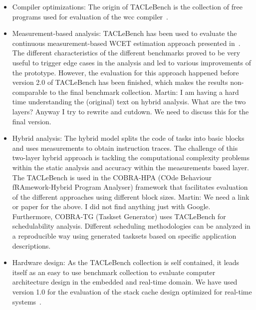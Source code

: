 \documentclass[a4paper,UKenglish]{oasics}
\newcommand{\todo}[1]{{\emph{TODO: #1}}}
\newcommand{\martin}[1]{{\color{blue} Martin: #1}}
\begin{document}
\begin{itemize}
\item Compiler optimizations: The origin of TACLeBench is the collection of free
programs used for evaluation of the wcc compiler~\cite{falk:wcc:wcet06}.
\item Measurement-based analysis: TACLeBench has been used to evaluate the continuous measurement-based WCET estimation approach presented
in~\cite{Dreyer2016}.
The different characteristics of the different benchmarks proved to be very useful to trigger edge cases in the analysis and led to various improvements of the prototype.
However, the evaluation for this approach happened before version 2.0 of TACLeBench has been finished,
which makes the results non-comparable to the final benchmark collection.
\martin{I am having a hard time understanding the (original) text on hybrid analysis.
What are the two layers? 
Anyway I try to rewrite and cutdown. We need to discuss this for the final version.}
\item Hybrid analysis: The hybrid model splits the code of tasks into basic blocks
and uses measurements to obtain instruction traces.
The  challenge  of  this  two-layer  hybrid  approach  is  tackling the computational complexity problems within the static analysis and accuracy  within  the  measurements based  layer.
The TACLeBench is used in the COBRA-HPA (COde Behaviour fRAmework-Hybrid Program Analyser) framework that facilitates evaluation of the different approaches using different block sizes.
\martin{We need a link or paper for the above. I did not find anything just with Google.}
Furthermore, COBRA-TG (Taskset Generator) uses TACLeBench for schedulability analysis.
Different scheduling methodologies can be analyzed in a reproducible way using generated
tasksets based on specific application descriptions.
\item Hardware design: As the TACLeBench collection is self contained, it leads itself
as an easy to use benchmark collection to evaluate computer architecture design in the
embedded and real-time domain. We have used version 1.0 for the evaluation of the
stack cache design optimized for real-time systems~\cite{patmos:stackcache:rts}.


\end{itemize}
\end{document}
